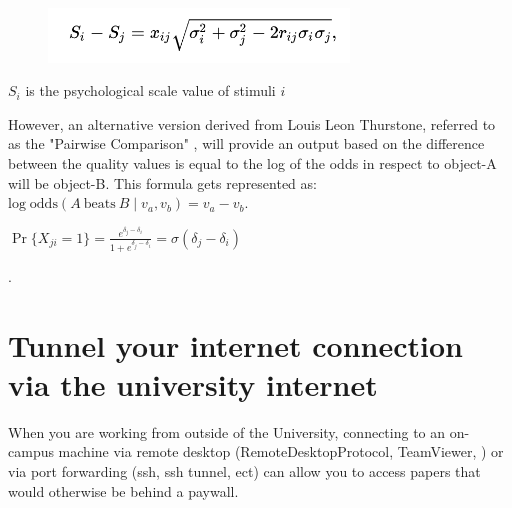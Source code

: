 		\begin{figure}[h]
			\includegraphics[width=8cm]{graphics/LCJ_formula.png}
			\caption{}
			\centering
		\end{figure}
	
		 $S_{i}$ is the psychological scale value of stimuli $i$
		
		However, an alternative version derived from Louis Leon Thurstone, referred to as the "Pairwise Comparison" \cite{thurstone1927law}, will provide an output based on the difference between the quality values is equal to the log of the odds in respect to object-A will be object-B. This formula gets represented as: 
		$\displaystyle \mathrm {log\;odds} (A\ {\text{beats}}\ B\mid v_{a},v_{b})=v_{a}-v_{b} $.
		
		$\Pr\{X_{ji}=1\}={\frac {e^{{\delta _{j}}-{\delta _{i}}}}{1+e^{{\delta _{j}}-{\delta _{i}}}}}=\sigma (\delta _{j}-\delta _{i})$
		
		 .


	\section{Tunnel your internet connection via the university internet}

When you are working from outside of the University, connecting to an on-campus machine via remote desktop (RemoteDesktopProtocol, TeamViewer, \etc) or via port forwarding (ssh, ssh tunnel, ect) can allow you to access papers that would otherwise be behind a paywall. 
		
